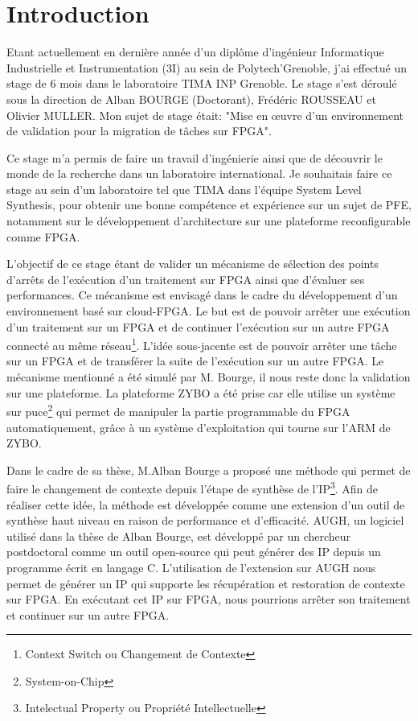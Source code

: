 \chapter{Introduction}
\OnehalfSpacing
\setlength{\parindent}{2em}
Etant actuellement en dernière année d'un diplôme d'ingénieur Informatique Industrielle et Instrumentation (3I) au sein de Polytech'Grenoble, j'ai effectué un stage de 6 mois dans le laboratoire TIMA INP Grenoble. Le stage s'est déroulé sous la direction de Alban BOURGE (Doctorant), Frédéric ROUSSEAU et Olivier MULLER. Mon sujet de stage était: "Mise en œuvre d'un environnement de validation pour la migration de tâches sur FPGA".

Ce stage m'a permis de faire un travail d'ingénierie ainsi que de découvrir le monde de la recherche
dans un laboratoire international. Je souhaitais faire ce stage au sein d'un laboratoire tel que TIMA dans l'équipe System Level Synthesis, pour obtenir une bonne compétence et expérience sur un sujet de PFE, notamment sur le développement d'architecture sur une plateforme reconfigurable comme FPGA. 

L'objectif de ce stage étant de valider un mécanisme de sélection des points d'arrêts de l'exécution d'un traitement sur FPGA ainsi que d'évaluer ses performances. 
Ce mécanisme est envisagé dans le cadre du développement d'un environnement basé sur cloud-FPGA. Le but est de pouvoir arrêter une exécution d'un traitement sur un FPGA et de continuer l'exécution sur un autre FPGA connecté au même réseau\footnote{Context Switch ou Changement de Contexte}. L'idée sous-jacente est de pouvoir arrêter une tâche sur un FPGA et de transférer la suite de l'exécution sur un autre FPGA. Le mécanisme mentionné a été simulé par M. Bourge, il nous reste donc la validation sur une plateforme. La plateforme ZYBO a été prise car elle utilise un système sur puce\footnote{System-on-Chip} qui permet de manipuler la partie programmable du FPGA automatiquement, grâce à un système d'exploitation qui tourne sur l'ARM de ZYBO.

Dans le cadre de sa thèse, M.Alban Bourge a proposé une méthode qui permet de faire le changement de contexte depuis l'étape de synthèse de l'IP\footnote{Intelectual Property ou Propriété Intellectuelle}. 
Afin de réaliser cette idée, la méthode est développée comme une extension d'un outil de synthèse haut niveau en raison de performance et d'efficacité. AUGH\cite{Aughweb,Prost2014}, un logiciel utilisé dans la thèse de Alban Bourge, est développé par un chercheur postdoctoral comme un outil open-source qui peut générer des IP depuis un programme écrit en langage C. L'utilisation de l'extension sur AUGH nous permet de générer un IP qui supporte les récupération et restoration de contexte sur FPGA. En exécutant cet IP sur FPGA, nous pourrions arrêter son traitement et continuer sur un autre FPGA. 


